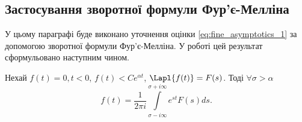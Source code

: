 \subsection{Застосування зворотної формули Фур'є-Мелліна}

У цьому параграфі буде виконано уточнення оцінки \eqref{eq:fine_asymptotics_1} за допомогою зворотної формули Фур'є-Мелліна. У роботі \cite{schiff1999laplace} цей результат сформульовано наступним чином.
\begin{thm}
\label{eq:mellin_thm}
Нехай $f(t) = 0, t < 0$,  $f(t) < Ce^{\alpha t}$, $\Lapl{f(t)} = F(s)$. Тоді $\forall \sigma > \alpha$
\begin{equation}
f(t) = \frac{1}{2\pi i}\int\limits_{\sigma - i\infty}^{\sigma + i\infty} e^{st} F(s) ds.
\end{equation}
\end{thm}
